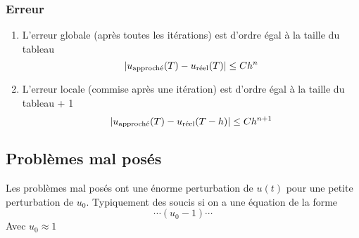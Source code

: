 \documentclass[resume]{subfiles}
\begin{document}
\subsubsection{Erreur}
\begin{enumerate}
\item L'erreur globale (après toutes les itérations) est d'ordre égal à la taille du tableau
$$\abs{u_{\text{approché}}(T)-u_\text{réel}(T)}\leq Ch^n$$
\item L'erreur locale (commise après une itération) est d'ordre égal à la taille du tableau + 1
$$\abs{u_{\text{approché}}(T)-u_\text{réel}(T-h)}\leq Ch^{n+1}$$
\end{enumerate}    
\subsection{Problèmes mal posés}
Les problèmes mal posés ont une énorme perturbation de $u(t)$ pour une petite perturbation de $u_0$. Typiquement des soucis si on a une équation de la forme
$$\cdots (u_0-1)\cdots$$
Avec $u_0\approx 1$
\end{document}
